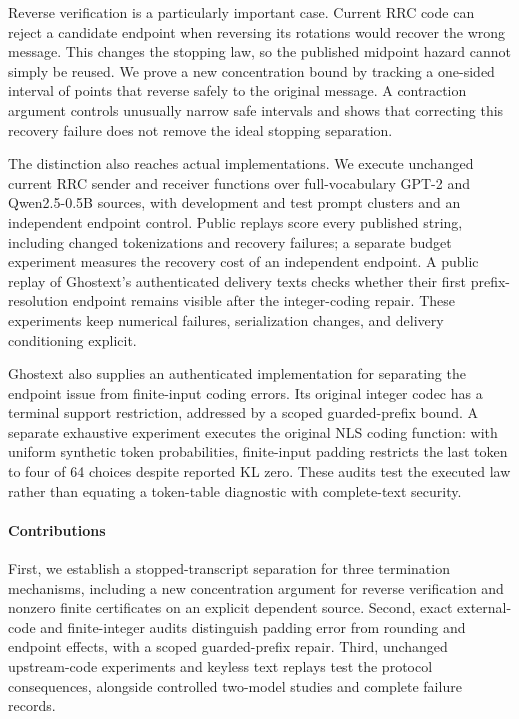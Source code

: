Reverse verification is a particularly important case. Current RRC code can
reject a candidate endpoint when reversing its rotations would recover the
wrong message. This changes the stopping law, so the published midpoint hazard
cannot simply be reused. We prove a new concentration bound by tracking a
one-sided interval of points that reverse safely to the original message.
A contraction argument controls unusually narrow safe intervals and shows
that correcting this recovery failure does not remove the ideal stopping
separation.

The distinction also reaches actual implementations. We execute unchanged
current RRC sender and receiver functions over full-vocabulary GPT-2 and
Qwen2.5-0.5B sources, with development and test prompt clusters and an independent
endpoint control. Public replays score every published string, including
changed tokenizations and recovery failures; a separate budget experiment
measures the recovery cost of an independent endpoint.
A public replay of Ghostext's authenticated delivery
texts checks whether their first prefix-resolution endpoint remains visible
after the integer-coding repair. These experiments keep numerical failures,
serialization changes, and delivery conditioning explicit.

Ghostext also supplies an authenticated implementation for separating the
endpoint issue from finite-input coding errors. Its original integer codec
has a terminal support restriction, addressed by a scoped guarded-prefix bound.
A separate exhaustive experiment executes the original NLS coding function:
with uniform synthetic token probabilities, finite-input padding restricts
the last token to four of 64 choices despite reported KL zero. These audits
test the executed law rather than equating a token-table diagnostic with
complete-text security.



\paragraph{Contributions}
First, we establish a stopped-transcript separation for three termination
mechanisms, including a new concentration argument for reverse verification
and nonzero finite certificates on an explicit dependent source. Second, exact external-code and
finite-integer audits distinguish padding error from rounding and endpoint
effects, with a scoped guarded-prefix repair. Third, unchanged upstream-code
experiments and keyless text replays test the protocol consequences, alongside
controlled two-model studies and complete failure records.


